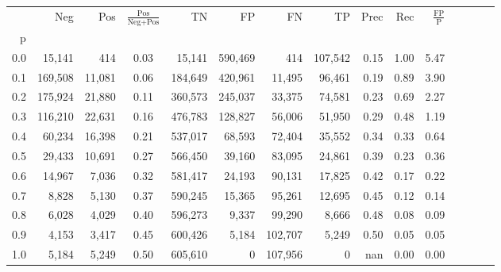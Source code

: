 \begin{tabular}{rrrcrrrrrrrrrrr}
\toprule
{} &      Neg &     Pos & $\frac{\text{Pos}}{\text{Neg}+\text{Pos}}$ &       TN &       FP &       FN &       TP &  Prec &   Rec & $\frac{\text{FP}}{\text{P}}$ \\
p   &          &         &                                            &          &          &          &          &       &       &                              \\
\midrule
0.0 &   15,141 &     414 &                                       0.03 &   15,141 &  590,469 &      414 &  107,542 &  0.15 &  1.00 &                         5.47 \\
0.1 &  169,508 &  11,081 &                                       0.06 &  184,649 &  420,961 &   11,495 &   96,461 &  0.19 &  0.89 &                         3.90 \\
0.2 &  175,924 &  21,880 &                                       0.11 &  360,573 &  245,037 &   33,375 &   74,581 &  0.23 &  0.69 &                         2.27 \\
0.3 &  116,210 &  22,631 &                                       0.16 &  476,783 &  128,827 &   56,006 &   51,950 &  0.29 &  0.48 &                         1.19 \\
0.4 &   60,234 &  16,398 &                                       0.21 &  537,017 &   68,593 &   72,404 &   35,552 &  0.34 &  0.33 &                         0.64 \\
0.5 &   29,433 &  10,691 &                                       0.27 &  566,450 &   39,160 &   83,095 &   24,861 &  0.39 &  0.23 &                         0.36 \\
0.6 &   14,967 &   7,036 &                                       0.32 &  581,417 &   24,193 &   90,131 &   17,825 &  0.42 &  0.17 &                         0.22 \\
0.7 &    8,828 &   5,130 &                                       0.37 &  590,245 &   15,365 &   95,261 &   12,695 &  0.45 &  0.12 &                         0.14 \\
0.8 &    6,028 &   4,029 &                                       0.40 &  596,273 &    9,337 &   99,290 &    8,666 &  0.48 &  0.08 &                         0.09 \\
0.9 &    4,153 &   3,417 &                                       0.45 &  600,426 &    5,184 &  102,707 &    5,249 &  0.50 &  0.05 &                         0.05 \\
1.0 &    5,184 &   5,249 &                                       0.50 &  605,610 &        0 &  107,956 &        0 &   nan &  0.00 &                         0.00 \\
\bottomrule
\end{tabular}

